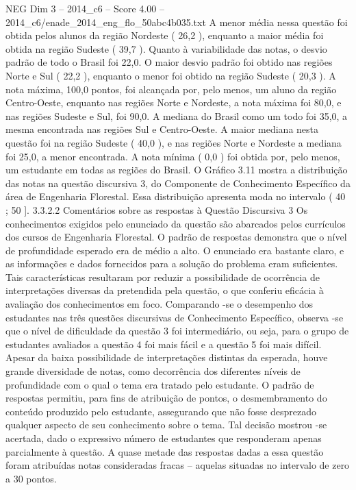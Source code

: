 \begin{textsample}{NEG Dim 3 – 2014\_c6 – Score 4.00 – 2014\_c6/enade\_2014\_eng\_flo\_50abc4b035.txt}
A menor média nessa questão foi obtida pelos alunos da região Nordeste ( 26,2 ), enquanto a maior média foi obtida na região Sudeste ( 39,7 ).
Quanto à variabilidade das notas, o desvio padrão de todo o Brasil foi 22,0.
O maior desvio padrão foi obtido nas regiões Norte e Sul ( 22,2 ), enquanto o menor foi obtido na região Sudeste ( 20,3 ).
A nota máxima, 100,0 pontos, foi alcançada por, pelo menos, um aluno da região Centro-Oeste, enquanto nas regiões Norte e Nordeste, a nota máxima foi 80,0, e nas regiões Sudeste e Sul, foi 90,0.
A mediana do Brasil como um todo foi 35,0, a mesma encontrada nas regiões Sul e Centro-Oeste.
A maior mediana nesta questão foi na região Sudeste ( 40,0 ), e nas regiões Norte e Nordeste a mediana foi 25,0, a menor encontrada.
A nota mínima ( 0,0 ) foi obtida por, pelo menos, um estudante em todas as regiões do Brasil.
O Gráfico 3.11 mostra a distribuição das notas na questão discursiva 3, do Componente de Conhecimento Específico da área de Engenharia Florestal.
Essa distribuição apresenta moda no intervalo ( 40 ; 50 ]. 3.3.2.2 Comentários sobre as respostas à Questão Discursiva 3 Os conhecimentos exigidos pelo enunciado da questão são abarcados pelos currículos dos cursos de Engenharia Florestal.
O padrão de respostas demonstra que o nível de profundidade esperado era de médio a alto.
O enunciado era bastante claro, e as informações e dados fornecidos para a solução do problema eram suficientes.
Tais características resultaram por reduzir a possibilidade de ocorrência de interpretações diversas da pretendida pela questão, o que conferiu eficácia à avaliação dos conhecimentos em foco.
Comparando -se o desempenho dos estudantes nas três questões discursivas de Conhecimento Específico, observa -se que o nível de dificuldade da questão 3 foi intermediário, ou seja, para o grupo de estudantes avaliados a questão 4 foi mais fácil e a questão 5 foi mais difícil.
Apesar da baixa possibilidade de interpretações distintas da esperada, houve grande diversidade de notas, como decorrência dos diferentes níveis de profundidade com o qual o tema era tratado pelo estudante.
O padrão de respostas permitiu, para fins de atribuição de pontos, o desmembramento do conteúdo produzido pelo estudante, assegurando que não fosse desprezado qualquer aspecto de seu conhecimento sobre o tema.
Tal decisão mostrou -se acertada, dado o expressivo número de estudantes que responderam apenas parcialmente à questão.
A quase metade das respostas dadas a essa questão foram atribuídas notas consideradas fracas – aquelas situadas no intervalo de zero a 30 pontos.

\end{textsample}
